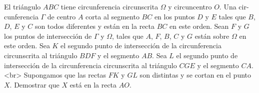 El triángulo $ABC$ tiene circunferencia circunscrita $\Omega$ y circuncentro $O$. Una cir- cunferencia $\Gamma$ de centro $A$ corta al segmento $BC$ en los puntos $D$ y $E$ tales que $B$, $D$, $E$ y $C$ son todos diferentes y están en la recta $BC$ en este orden. Sean $F$ y $G$ los puntos de intersección de $\Gamma$ y $\Omega$, tales que $A$, $F$, $B$, $C$ y $G$ están sobre $\Omega$ en este orden. Sea $K$ el segundo punto de intersección de la circunferencia circunscrita al triángulo $BDF$ y el segmento $AB$. Sea $L$ el segundo punto de intersección de la circunferencia circunscrita al triángulo $CGE$ y el segmento $CA$.<br>
Supongamos que las rectas $FK$ y $GL$ son distintas y se cortan en el punto $X$. Demostrar que $X$ está en la recta $AO$.